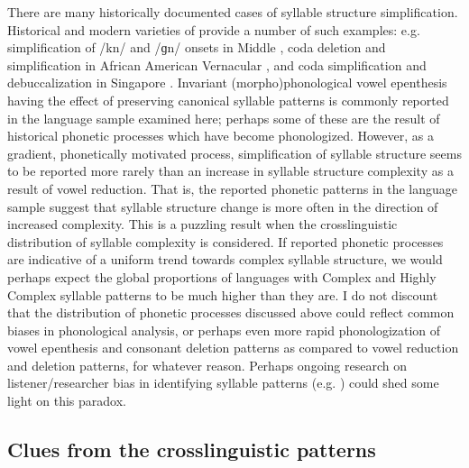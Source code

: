   There are many historically documented cases of syllable structure simplification. Historical and modern varieties of  provide a number of such examples: e.g. simplification of /kn/ and /ɡn/ onsets in Middle  \citep{Minkova2003}, coda deletion and simplification in African American Vernacular  \citep{Rickford1999}, and coda simplification and debuccalization in Singapore  \citep{Deterding2007}. Invariant (morpho)phonological vowel epenthesis having the effect of preserving canonical syllable patterns is commonly reported in the language sample examined here; perhaps some of these are the result of historical phonetic processes which have become phonologized. However, as a gradient, phonetically motivated process, simplification of syllable structure seems to be reported more rarely than an increase in syllable structure complexity as a result of vowel reduction. That is, the reported phonetic patterns in the language sample suggest that syllable structure change is more often in the direction of increased complexity. This is a puzzling result when the crosslinguistic distribution of syllable complexity is considered. If reported phonetic processes are indicative of a uniform trend towards complex syllable structure, we would perhaps expect the global proportions of languages with Complex and Highly Complex syllable patterns to be much higher than they are. I do not discount that the distribution of phonetic processes discussed above could reflect common biases in phonological analysis, or perhaps even more rapid phonologization of vowel epenthesis and consonant deletion patterns as compared to vowel reduction and deletion patterns, for whatever reason. Perhaps ongoing research on listener/researcher bias in identifying syllable patterns (e.g. \citealt{KwonEtAl2017}) could shed some light on this paradox.

\subsection{Clues from the crosslinguistic patterns}\label{sec:8.4.2}

